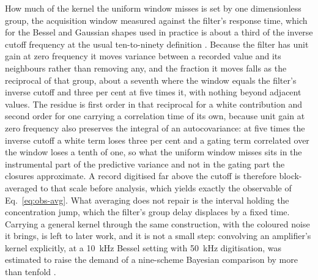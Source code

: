 How much of the kernel the uniform window misses is set by one dimensionless group, the
acquisition window measured against the filter's response time, which for the Bessel and Gaussian
shapes used in practice is about a third of the inverse cutoff frequency at the usual
ten-to-ninety definition \citep{colquhoun1995fitting}. Because the filter has unit
gain at zero frequency it moves variance between a recorded value and its neighbours rather
than removing any, and the fraction it moves falls as the reciprocal of that group, about a
seventh where the window equals the filter's inverse cutoff and three per cent at five times
it, with nothing beyond adjacent values. The residue is first order in that reciprocal for a
white contribution and second order for one carrying a correlation time of its own, because unit
gain at zero frequency also preserves the integral of an autocovariance: at five times the inverse
cutoff a white term loses three per cent and a gating term correlated over the window loses a tenth
of one, so what the uniform window misses sits in the instrumental part of the predictive variance
and not in the gating part the closures approximate. A record digitised far above the cutoff is therefore
block-averaged to that scale before analysis, which yields exactly the observable of
Eq.~\ref{eq:obs-avg}. What averaging does not repair is the interval holding the
concentration jump, which the filter's group delay displaces by a fixed time. Carrying a
general kernel through the same construction, with the coloured noise it brings, is left to
later work, and it is not a small step: convolving an amplifier's kernel explicitly, at a
\SI{10}{\kilo\hertz} Bessel setting with \SI{50}{\kilo\hertz} digitisation, was estimated to
raise the demand of a nine-scheme Bayesian comparison by more than tenfold
\citep{moffatt2025bayesian}.

